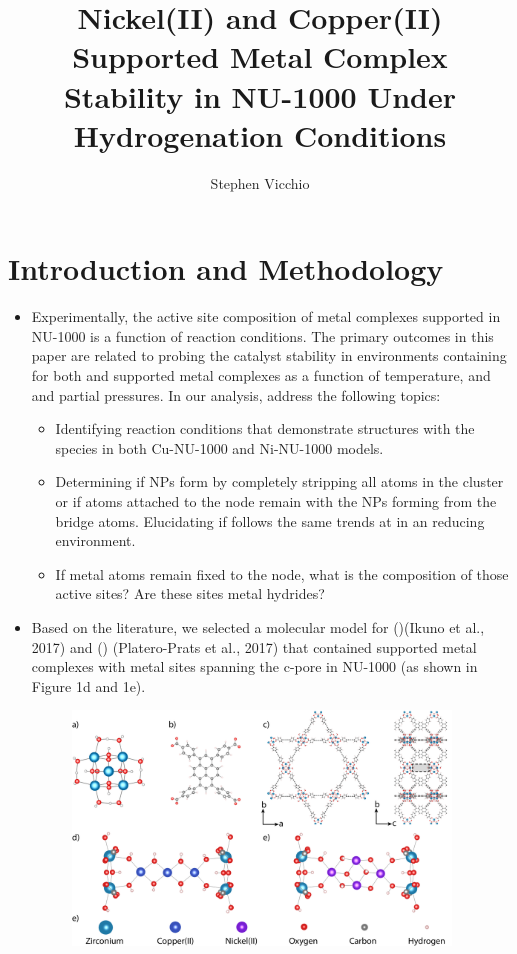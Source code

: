 \documentclass[12pt]{article}
\title{Nickel(II) and Copper(II) Supported Metal Complex Stability in NU-1000 Under Hydrogenation Conditions}
\author{Stephen Vicchio}
\begin{document}
\maketitle

\section{Introduction and Methodology}
\begin{itemize}
    \item  Experimentally, the active site composition of  metal complexes supported in NU-1000 is a function of reaction conditions. The primary outcomes in this paper are related to  probing the catalyst stability in environments containing  for both  and  supported metal complexes as a function of temperature, and  and  partial pressures. In our analysis, address the following topics:
    \begin{itemize}
        \item Identifying reaction conditions that demonstrate structures with the  species in both Cu-NU-1000 and Ni-NU-1000 models. 
        \item Determining if  NPs form by completely stripping all  atoms in the cluster or if  atoms attached to the node remain with the NPs forming from the bridge  atoms. Elucidating if  follows the same trends at  in an  reducing environment. 
        \item 
        If metal atoms remain fixed to the node, what is the composition of those active sites? Are these sites metal hydrides? 
    \end{itemize}
    \item Based on the literature, we selected a molecular model for  ()(Ikuno et al., 2017) and  () (Platero-Prats et al., 2017) that contained supported metal complexes with metal sites spanning the c-pore in NU-1000 (as shown in Figure 1d and 1e).
    \begin{figure}[H]
        \centering
        \includegraphics[width=0.95\textwidth]{zi-images/00-General-Graphics/2020-07-31-Combined-MOF-Figure-final.png}

\end{figure}
\end{itemize}
\end{document}
